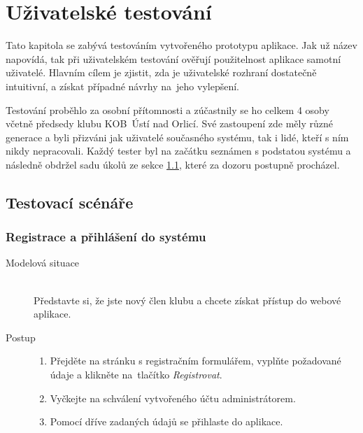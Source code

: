 \chapter{Uživatelské testování}
Tato kapitola se zabývá testováním vytvořeného prototypu aplikace. Jak už název napovídá, tak při uživatelském testování ověřují použitelnost aplikace samotní uživatelé. Hlavním cílem je zjistit, zda je uživatelské rozhraní dostatečně intuitivní, a získat případné návrhy na~jeho vylepšení.

Testování proběhlo za osobní přítomnosti a zúčastnily se ho celkem 4 osoby včetně předsedy klubu KOB~Ústí nad Orlicí. Své zastoupení zde měly různé generace a byli přizváni jak uživatelé současného systému, tak i lidé, kteří s ním nikdy nepracovali. Každý tester byl na začátku seznámen s podstatou systému a následně obdržel sadu úkolů ze sekce \ref{test-cases}, které za dozoru postupně procházel.

\section{Testovací scénáře}\label{test-cases}

\subsection{Registrace a přihlášení do systému}
\begin{description}
    \item[Modelová situace] \hfill \\
        Představte si, že jste nový člen klubu a chcete získat přístup do webové aplikace.
    \item[Postup] \hfill
        \vspace{-2mm}
        \begin{enumerate}
            \item Přejděte na stránku s registračním formulářem, vyplňte požadované údaje a klikněte na~tlačítko \emph{Registrovat}.
            \item Vyčkejte na schválení vytvořeného účtu administrátorem.
            \item Pomocí dříve zadaných údajů se přihlaste do aplikace.
        \end{enumerate}
\end{description}

